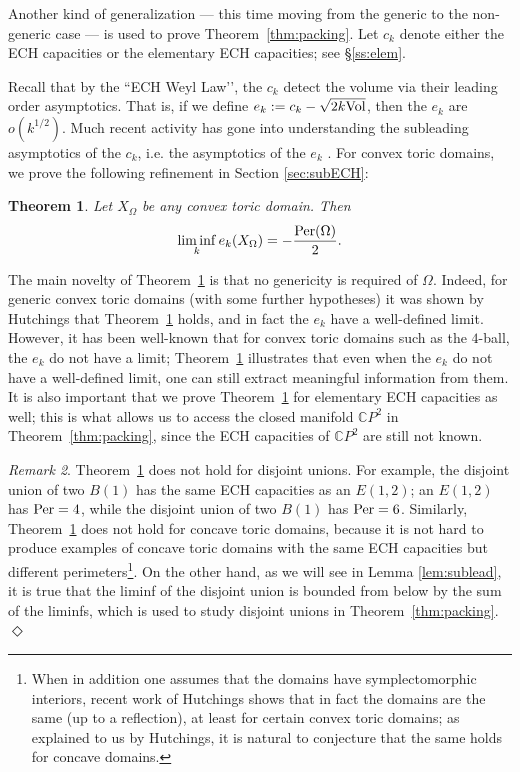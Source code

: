 \documentclass[11pt, reqno]{amsart}
\newtheorem{thm}{Theorem}[subsection]
\theoremstyle{remark}
\numberwithin{equation}{subsection}
\numberwithin{figure}{section}
\theoremstyle{customremark}
\newtheorem{rmk_no_diamond}[thm]{Remark}
\newenvironment{rmk}{\begin{rmk_no_diamond} } {\hfill$\er$ \end{rmk_no_diamond}}
\newcommand{\Vol}{{\rm Vol}}
\newcommand{\Per}{{\rm Per}}
\newcommand{\Om}{{\Omega}}
\newcommand{\er}{{\Diamond}}
\begin{document}
Another kind of generalization --- this time moving from the generic to the non-generic case --- is used to prove Theorem~\ref{thm:packing}.  Let $c_k$ denote either the ECH capacities or the elementary ECH capacities; see \S\ref{ss:elem}.

Recall that by the ``ECH Weyl Law\rq\rq, the $c_k$ detect the volume via their leading order asymptotics.  That is, if we define $e_k := c_k - \sqrt{2k \Vol}$, then the $e_k$ are $o(k^{1/2})$.  Much recent activity has gone into understanding the subleading asymptotics of the $c_k$, i.e. the asymptotics of the $e_k$ \cite{Ruel,cghind,Edtmair}.  For convex toric domains, we prove the following refinement in Section \ref{sec:subECH}:

\begin{thm}
\label{thm:convexper}
Let $X_{\Omega}$ be any convex toric domain.  Then
\[ \liminf_k e_k(X_{\Omega}) = - \frac{\Per(\Omega)}{2}.\]
\end{thm} 

The main novelty of Theorem~\ref{thm:convexper} is that no genericity is required of $\Om$.  Indeed, for generic convex toric domains (with some further hypotheses) it was shown by Hutchings that Theorem~\ref{thm:convexper} holds, and in fact the $e_k$ have a well-defined limit.  However, it has been well-known that for  convex toric domains such as the $4$-ball, the $e_k$ do not
have a limit; Theorem~\ref{thm:convexper} illustrates that even when the $e_k$ do not have a well-defined limit, one can still extract meaningful information from them.  It is also important that we prove Theorem~\ref{thm:convexper} for elementary ECH capacities as well; this is what allows us to access the closed manifold $\mathbb{C}P^2$ in Theorem~\ref{thm:packing}, since the ECH capacities of $\mathbb{C}P^2$ are still not known. 


\begin{rmk}
\label{rmk:concave}
Theorem~\ref{thm:convexper} does not hold for disjoint unions.  For example, the disjoint union of two $B(1)$ has the same ECH capacities as an $E(1,2)$; an $E(1,2)$ has $\Per = 4$, while the disjoint union of two $B(1)$ has $\Per = 6$.  Similarly, Theorem~\ref{thm:convexper} does not hold for concave toric domains, because it is not hard to produce examples of concave toric domains with the same ECH capacities but different perimeters\footnote{When in addition one assumes that the domains have symplectomorphic interiors, recent work of Hutchings \cite{zoominar} shows that in fact the domains are the same (up to a reflection), at least for certain convex toric domains; as explained to us by Hutchings, it is natural to conjecture that the same holds for concave domains.}.
On the other hand, as we will see in Lemma \ref{lem:sublead}, it is true that the liminf of the disjoint union is bounded from below by the sum of the liminfs, which is used to study disjoint unions in Theorem~\ref{thm:packing}.
\end{rmk}
\end{document}
